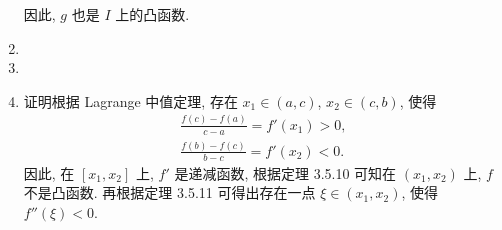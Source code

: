\documentclass[a4paper, 10pt]{ctexart}
\begin{document}
\begin{enumerate}
        因此, $g$ 也是 $I$ 上的凸函数.
    \item %
    \item %
    \item %
        {\heiti 证明}\quad 根据 Lagrange 中值定理, 存在 $x_1 \in (a, c)$, $x_2 \in (c, b)$, 使得
        \begin{gather*}
            \frac{f(c) - f(a)}{c - a} = f'(x_1) > 0, \\
            \frac{f(b) - f(c)}{b - c} = f'(x_2) < 0.    
        \end{gather*}
        因此, 在 $[x_1, x_2]$ 上, $f'$ 是递减函数, 根据定理 3.5.10 可知在 $(x_1, x_2)$ 上, $f$ 不是凸函数.
        再根据定理 3.5.11 可得出存在一点 $\xi \in (x_1, x_2)$, 使得 $f''(\xi) < 0$.
\end{enumerate}
\end{document}
